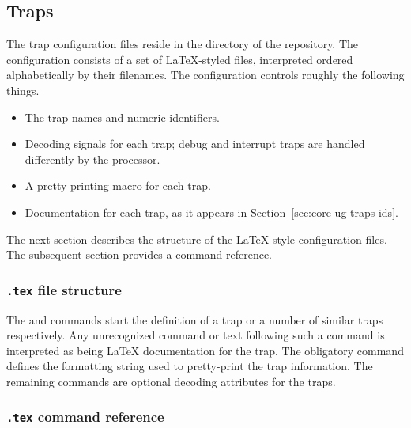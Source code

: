 
\subsection{Traps}
\label{sec:core-ug-cfg-traps}

The trap configuration files reside in the  directory of the 
\rvex{} repository. The configuration consists of a set of LaTeX-styled files, 
interpreted ordered alphabetically by their filenames. The configuration 
controls roughly the following things.

\begin{itemize}

\item The trap names and numeric identifiers.

\item Decoding signals for each trap; debug and interrupt traps are handled
      differently by the processor.
      
\item A pretty-printing macro for each trap.
      
\item Documentation for each trap, as it appears in
      Section~\ref{sec:core-ug-traps-ids}.

\end{itemize}

\noindent The next section describes the structure of the LaTeX-style
configuration files. The subsequent section provides a command reference.


\subsubsection[.tex file structure]{\texttt{.tex} file structure}
\label{sec:core-ug-cfg-opc-struct}

The \code{\trap} and \code{\trapgen} commands start the definition of a trap or
a number of similar traps respectively. Any unrecognized command or text
following such a command is interpreted as being LaTeX documentation for the
trap. The obligatory \code{\description} command defines the formatting string
used to pretty-print the trap information. The remaining commands are optional
decoding attributes for the traps.


\subsubsection[.tex command reference]{\texttt{.tex} command reference}
\label{sec:core-ug-cfg-opc-cref}

